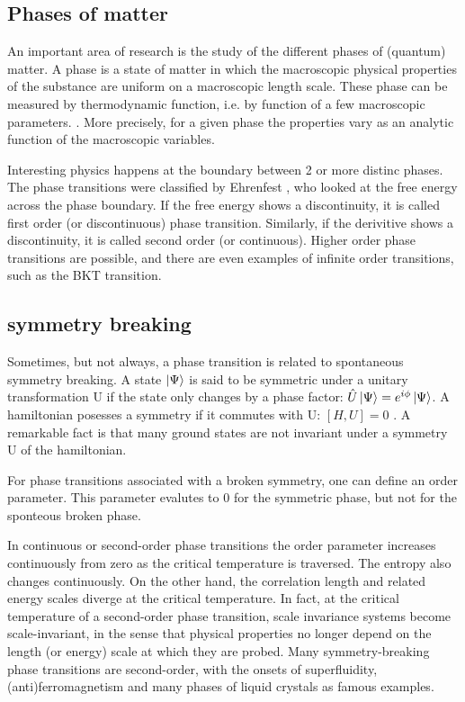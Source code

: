 \subsection{Phases of matter}

An important area of research is the study of the different phases of (quantum) matter. A phase is a state
of matter in which the macroscopic physical properties of the substance are uniform on a macroscopic length scale. These phase can be measured by thermodynamic function, i.e. by function of a few macroscopic parameters. \cite{Nishimori2011}. More precisely, for a given phase the properties vary as an analytic function of the macroscopic variables.

Interesting physics happens at the boundary between 2 or more distinc phases. The phase transitions were classified by Ehrenfest \cite{Jaeger1998}, who looked at the free energy across the phase boundary. If the free energy shows a discontinuity, it is called first order (or discontinuous) phase transition. Similarly, if the derivitive shows a discontinuity, it is called second order (or continuous). Higher order phase transitions are possible, and there are even examples of infinite order transitions, such as the BKT transition.

\subsection{symmetry breaking}

Sometimes, but not always, a phase transition is  related to spontaneous symmetry breaking. A state $\ket{\Psi}$ is said to be symmetric under a unitary transformation U if the state only changes by a phase factor: $ \hat{U} \ket{\Psi} = e^{i \phi} \ket{\Psi} $. A hamiltonian posesses a symmetry if it commutes with U: $ [H,U]=0$  \cite{Beekman2019}. A remarkable fact is that many ground states are not invariant under a symmetry U of the hamiltonian.

For phase transitions associated with a broken symmetry, one can define an order parameter. This parameter evalutes to 0 for the symmetric phase, but not for the sponteous broken phase.

In continuous or second-order phase transitions the order parameter increases continuously from zero as the critical temperature is traversed. The entropy also changes continuously. On the other hand, the correlation length and related energy scales diverge at the critical temperature. In fact, at the critical temperature of a second-order phase transition, scale invariance systems become scale-invariant, in the sense that physical properties no longer depend on the length (or energy) scale at which they are probed. Many symmetry-breaking phase transitions are second-order, with the onsets of superfluidity, (anti)ferromagnetism and many phases of liquid crystals as famous examples.\cite{Beekman2019}

